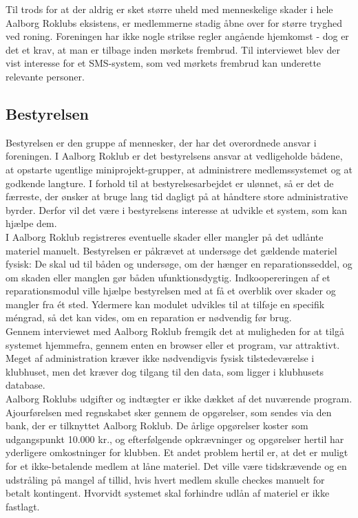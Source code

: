 Til trods for at der aldrig er sket større uheld med menneskelige skader i hele Aalborg Roklubs eksistens, er medlemmerne stadig åbne over for større tryghed ved roning. Foreningen har ikke nogle strikse regler angående hjemkomst - dog er det et krav, at man er tilbage inden mørkets frembrud. Til interviewet blev der vist interesse for et SMS-system, som ved mørkets frembrud kan underette relevante personer.

\subsection*{Bestyrelsen}

Bestyrelsen er den gruppe af mennesker, der har det overordnede ansvar i foreningen. I Aalborg Roklub er det bestyrelsens ansvar at vedligeholde bådene, at opstarte ugentlige miniprojekt-grupper, at administrere medlemssystemet og at godkende langture. I forhold til at bestyrelsesarbejdet er ulønnet, så er det de færreste, der ønsker at bruge lang tid dagligt på at håndtere store administrative byrder. Derfor vil det være i bestyrelsens interesse at udvikle et system, som kan hjælpe dem.\\

I Aalborg Roklub registreres eventuelle skader eller mangler på det udlånte materiel manuelt. Bestyrelsen er påkrævet at undersøge det gældende materiel fysisk: De skal ud til båden og undersøge, om der hænger en reparationsseddel, og om skaden eller manglen gør båden ufunktionsdygtig. Indkoopereringen af et reparationsmodul ville hjælpe bestyrelsen med at få et overblik over skader og mangler fra ét sted. Ydermere kan modulet udvikles til at tilføje en specifik méngrad, så det kan vides, om en reparation er nødvendig før brug.\\

Gennem interviewet med Aalborg Roklub fremgik det at muligheden for at tilgå systemet hjemmefra, gennem enten en browser eller et program, var attraktivt. Meget af administration kræver ikke nødvendigvis fysisk tilstedeværelse i klubhuset, men det kræver dog tilgang til den data, som ligger i klubhusets database.\\

Aalborg Roklubs udgifter og indtægter er ikke dækket af det nuværende program. Ajourførelsen med regnskabet sker gennem de opgørelser, som sendes via den bank, der er tilknyttet Aalborg Roklub. De årlige opgørelser koster som udgangspunkt 10.000 kr., og efterfølgende opkrævninger og opgørelser hertil har yderligere omkostninger for klubben. Et andet problem hertil er, at det er muligt for et ikke-betalende medlem at låne materiel. Det ville være tidskrævende og en udstråling på mangel af tillid, hvis hvert medlem skulle checkes manuelt for betalt kontingent. Hvorvidt systemet skal forhindre udlån af materiel er ikke fastlagt.

